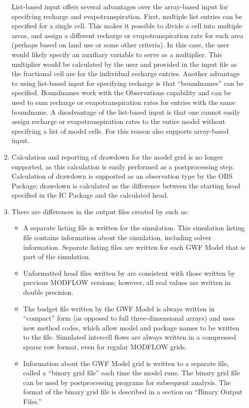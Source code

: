 \begin{enumerate}
List-based input offers several advantages over the array-based input for specifying recharge and evapotranspiration.  First, multiple list entries can be specified for a single cell.  This makes it possible to divide a cell into multiple areas, and assign a different recharge or evapotranspiration rate for each area (perhaps based on land use or some other criteria).  In this case, the user would likely specify an auxiliary variable to serve as a multiplier.  This multiplier would be calculated by the user and provided in the input file as the fractional cell are for the individual recharge entries.  Another advantage to using list-based input for specifying recharge is that ``boundnames'' can be specified.  Boundnames work with the Observations capability and can be used to sum recharge or evapotranspiration rates for entries with the same boundname.  A disadvantage of the list-based input is that one cannot easily assign recharge or evapotranspiration rates to the entire model without specifying a list of model cells.  For this reason \mf also supports array-based input.

\item Calculation and reporting of drawdown for the model grid is no longer supported, as this calculation is easily performed as a postprocessing step.  Calculation of drawdown is supported as an observation type by the OBS Package; 
drawdown is calculated as the difference between the starting head specified in the IC Package and the calculated head.

\item There are differences in the output files created by \mfcomma such as:
\begin{itemize}

\item A separate listing file is written for the simulation.  This simulation listing file contains information about the simulation, including solver information.  Separate listing files are written for each GWF Model that is part of the simulation.

\item Unformatted head files written by \mf are consistent with those written by previous MODFLOW versions; however, all real values are written in double precision.

\item The budget file written by the GWF Model is always written in ``compact'' form (as opposed to full three-dimensional arrays) and uses new method codes, which allow model and package names to be written to the file.  Simulated intercell flows are always written in a compressed sparse row format, even for regular MODFLOW grids.

\item Information about the GWF Model grid is written to a separate file, called a ``binary grid file'' each time the model runs.  The binary grid file can be used by postprocessing programs for subsequent analysis.  The format of the binary grid file is described in a section on ``Binary Output Files.''

\end{itemize}


\end{enumerate}
